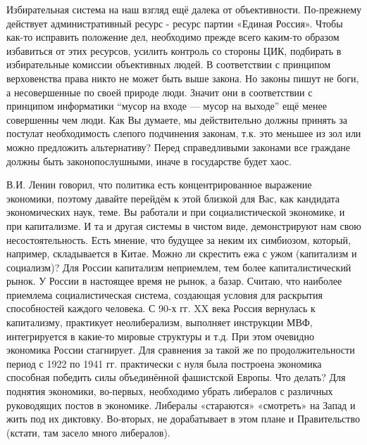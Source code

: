 \begin{drama}
	\michaelspeaks Избирательная система на наш взгляд ещё далека от объективности. По-прежнему действует административный ресурс - ресурс партии «Единая Россия». Чтобы как-то исправить положение дел, необходимо прежде всего каким-то образом избавиться от этих ресурсов, усилить контроль со стороны ЦИК, подбирать в избирательные комиссии объективных людей.	
	\maxspeaks В соответствии с принципом верховенства права никто не может быть выше закона. Но законы пишут не боги, а несовершенные по своей природе люди. Значит они в соответствии с принципом информатики “мусор на входе — мусор на выходе” ещё менее совершенны чем люди. Как Вы думаете, мы действительно должны принять за постулат необходимость слепого подчинения законам, т.к. это меньшее из зол или можно предложить альтернативу?  
	\michaelspeaks Перед справедливыми законами все граждане должны быть законопослушными, иначе в государстве будет хаос.

	\maxspeaks В.И. Ленин говорил, что политика есть концентрированное выражение экономики, поэтому давайте перейдём к этой близкой для Вас, как кандидата экономических наук, теме. Вы работали и при социалистической экономике, и при капитализме. И та и другая системы в чистом виде, демонстрируют нам свою несостоятельность. Есть мнение, что будущее за неким их симбиозом, который, например, складывается в Китае. Можно ли скрестить ежа с ужом (капитализм и социализм)?
	\michaelspeaks Для России капитализм неприемлем, тем более капиталистический рынок. У России в настоящее время не рынок, а базар. Считаю, что наиболее приемлема социалистическая система, создающая условия для раскрытия способностей каждого человека.
	\maxspeaks С 90-х гг. XX века Россия вернулась к капитализму, практикует неолиберализм, выполняет инструкции МВФ, интегрируется в какие-то мировые структуры и т.д. При этом очевидно экономика России стагнирует. Для сравнения за такой же по продолжительности период с 1922 по 1941 гг. практически с нуля была построена экономика способная победить силы объединённой фашистской Европы. Что делать? 
	\michaelspeaks Для поднятия экономики, во-первых, необходимо убрать либералов с различных руководящих постов в экономике. Либералы «стараются» «смотреть» на Запад и жить под их диктовку. Во-вторых, не дорабатывает в этом плане и Правительство (кстати, там засело много либералов).


\end{drama}
